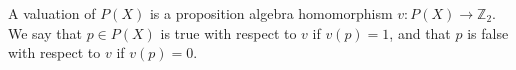A valuation of $P(X)$ is a proposition algebra homomorphism $v: P(X) \to \mathbb{Z}_2$. We say that $p \in P(X)$ is true with respect to $v$ if $v(p) = 1$, and that $p$ is false with respect to $v$ if $v(p) = 0$.
